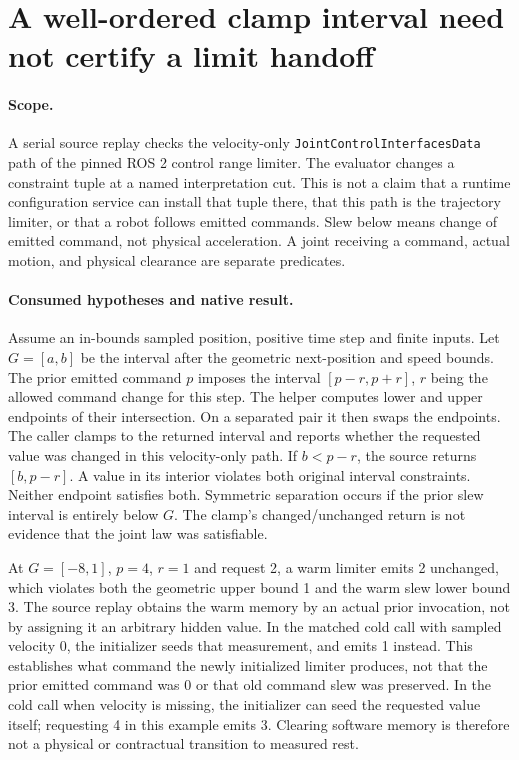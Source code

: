 \documentclass{article}
\begin{document}
\section*{A well-ordered clamp interval need not certify a limit handoff}
\paragraph{Scope.} A serial source replay checks the velocity-only
\texttt{JointControlInterfacesData} path of the pinned ROS 2 control
range limiter. The evaluator changes a constraint tuple at a named
interpretation cut. This is not a claim that a runtime configuration
service can install that tuple there, that this path is the trajectory
limiter, or that a robot follows emitted commands. Slew below means
change of emitted command, not physical acceleration. A joint
receiving a command, actual motion, and physical clearance are
separate predicates.

\paragraph{Consumed hypotheses and native result.}
Assume an in-bounds sampled position, positive time step and finite
inputs. Let $G=[a,b]$ be the interval after the geometric next-position
and speed bounds. The prior emitted command $p$ imposes the
interval $[p-r,p+r]$, $r$ being the allowed command change for this
step. The helper computes lower and upper endpoints of their
intersection. On a separated pair it then swaps the endpoints.
The caller clamps to the returned interval and reports whether the
requested value was changed in this velocity-only path. If
$b<p-r$, the source returns $[b,p-r]$. A value in its interior
violates both original interval constraints. Neither endpoint satisfies
both. Symmetric separation occurs if the prior slew interval is
entirely below $G$. The clamp's changed/unchanged return is not
evidence that the joint law was satisfiable.

At $G=[-8,1]$, $p=4$, $r=1$ and request 2, a warm limiter emits
2 unchanged, which violates both the geometric upper bound 1 and
the warm slew lower bound 3. The source replay obtains the warm
memory by an actual prior invocation, not by assigning it an
arbitrary hidden value. In the matched cold call with sampled
velocity 0, the initializer seeds that measurement, and emits 1
instead. This establishes what command the newly initialized
limiter produces, not that the prior emitted command was 0 or
that old command slew was preserved. In the cold call when
velocity is missing, the initializer can seed the requested
value itself; requesting 4 in this example emits 3. Clearing
software memory is therefore not a physical or contractual
transition to measured rest.
\end{document}

